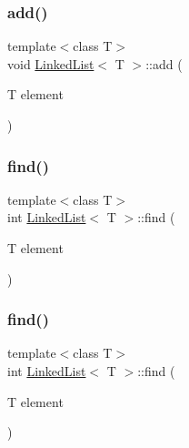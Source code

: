 \mbox{\label{classLinkedList_ab7364799e5965dd59d4f5952cb953287}} 
\subsubsection{\texorpdfstring{add()}{add()}\hspace{0.1cm}{\footnotesize\ttfamily [2/2]}}
{\footnotesize\ttfamily template$<$class T$>$ \\
void \mbox{\hyperlink{classLinkedList}{Linked\+List}}$<$ T $>$\+::add (\begin{DoxyParamCaption}\item[{T}]{element }\end{DoxyParamCaption})}

\mbox{\label{classLinkedList_a924e217dd525b84492e9f0dc61db96bc}} 
\subsubsection{\texorpdfstring{find()}{find()}\hspace{0.1cm}{\footnotesize\ttfamily [1/2]}}
{\footnotesize\ttfamily template$<$class T$>$ \\
int \mbox{\hyperlink{classLinkedList}{Linked\+List}}$<$ T $>$\+::find (\begin{DoxyParamCaption}\item[{T}]{element }\end{DoxyParamCaption})}

\mbox{\label{classLinkedList_a924e217dd525b84492e9f0dc61db96bc}} 
\subsubsection{\texorpdfstring{find()}{find()}\hspace{0.1cm}{\footnotesize\ttfamily [2/2]}}
{\footnotesize\ttfamily template$<$class T$>$ \\
int \mbox{\hyperlink{classLinkedList}{Linked\+List}}$<$ T $>$\+::find (\begin{DoxyParamCaption}\item[{T}]{element }\end{DoxyParamCaption})}

